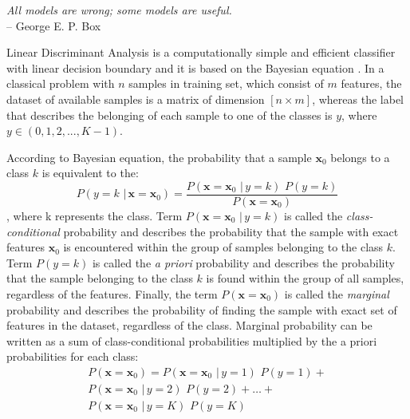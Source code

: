 \narrowlinespacing
\begin{myquote}
\begin{flushright}
\textit{All models are wrong; some models are useful.} \\-- George E. P. Box
\end{flushright}
\end{myquote}
\normallinespacing
%

Linear Discriminant Analysis is a computationally simple and efficient classifier with linear decision boundary and it is based on the Bayesian equation \citep{McLachlan2004}. In a classical problem with $n$ samples in training set, which consist of $m$ features, the dataset of available samples is a matrix of dimension $[n \times m]$, whereas the label that describes the belonging of each sample to one of the classes is $y$, where $y \in (0,1,2,...,K-1)$.

According to Bayesian equation, the probability that a sample $\mathbf{x}_0$ belongs to a class $k$ is equivalent to the: 
\begin{equation} 
P(y=k \,\, | \, \mathbf{x}=\mathbf{x}_0) = \frac{P(\mathbf{x}=\mathbf{x}_0  \,\, | \, y=k) \,\,P(y=k)} {P(\mathbf{x}=\mathbf{x}_0)}
\end{equation}
\noindent
, where k represents the class. Term $P(\mathbf{x}=\mathbf{x}_0  \,\, | \, y=k)$ is called the \emph{class-conditional} probability and describes the probability that the sample with exact features $\mathbf{x}_0$ is encountered within the group of samples belonging to the class $k$. Term $P(y=k)$ is called the \emph{a priori} probability and describes the probability that the sample belonging to the class $k$ is found within the group of all samples, regardless of the features. Finally, the term $P(\mathbf{x}=\mathbf{x}_0)$ is called the \emph{marginal} probability and describes the probability of finding the sample with exact set of features in the dataset, regardless of the class. Marginal probability can be written as a sum of class-conditional probabilities multiplied by the a priori probabilities for each class:
\begin{equation}
\begin{split}
P(\mathbf{x}=\mathbf{x}_0) = P(\mathbf{x}=\mathbf{x}_0  \,\, | \, y=1) \,\,P(y=1) + \\
P(\mathbf{x}=\mathbf{x}_0  \,\, | \, y=2) \,\,P(y=2) + \dots + \\
P(\mathbf{x}=\mathbf{x}_0  \,\, | \, y=K) \,\,P(y=K)
\end{split}
\end{equation}

